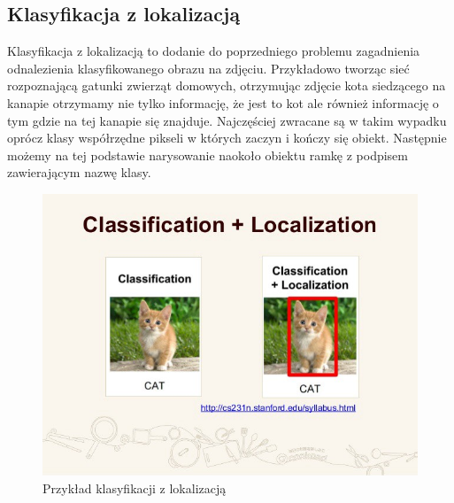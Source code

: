 \documentclass{article}
\begin{document}
\subsection{Klasyfikacja z lokalizacją}
Klasyfikacja z lokalizacją to dodanie do poprzedniego problemu zagadnienia odnalezienia klasyfikowanego obrazu na zdjęciu.
Przykładowo tworząc sieć rozpoznającą gatunki zwierząt domowych, otrzymując zdjęcie kota siedzącego na kanapie otrzymamy nie tylko informację,
że jest to kot ale również informację o tym gdzie na tej kanapie się znajduje.
Najczęściej zwracane są w takim wypadku oprócz klasy współrzędne pikseli w których zaczyn i kończy się obiekt.
Następnie możemy na tej podstawie narysowanie naokoło obiektu ramkę z podpisem zawierającym nazwę klasy.
\begin{figure}[H]
  \centering
  \includegraphics[width=\linewidth]{images/klasyfikacja_z_lokalizacja.jpeg}
  \caption{Przykład klasyfikacji z lokalizacją}
  \label{fig:klasyfikacja_z_lokalizacja}
\end{figure}
\end{document}
